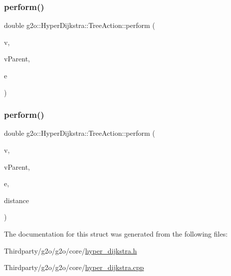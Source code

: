 \subsubsection{\texorpdfstring{perform()}{perform()}\hspace{0.1cm}{\footnotesize\ttfamily [1/2]}}
{\footnotesize\ttfamily double g2o\+::\+Hyper\+Dijkstra\+::\+Tree\+Action\+::perform (\begin{DoxyParamCaption}\item[{\mbox{\hyperlink{classg2o_1_1_hyper_graph_1_1_vertex}{Hyper\+Graph\+::\+Vertex}} $\ast$}]{v,  }\item[{\mbox{\hyperlink{classg2o_1_1_hyper_graph_1_1_vertex}{Hyper\+Graph\+::\+Vertex}} $\ast$}]{v\+Parent,  }\item[{\mbox{\hyperlink{classg2o_1_1_hyper_graph_1_1_edge}{Hyper\+Graph\+::\+Edge}} $\ast$}]{e }\end{DoxyParamCaption})\hspace{0.3cm}{\ttfamily [virtual]}}

\mbox{\label{structg2o_1_1_hyper_dijkstra_1_1_tree_action_a2f78bac199af9afea7105f3dd9f2e963}} 
\subsubsection{\texorpdfstring{perform()}{perform()}\hspace{0.1cm}{\footnotesize\ttfamily [2/2]}}
{\footnotesize\ttfamily double g2o\+::\+Hyper\+Dijkstra\+::\+Tree\+Action\+::perform (\begin{DoxyParamCaption}\item[{\mbox{\hyperlink{classg2o_1_1_hyper_graph_1_1_vertex}{Hyper\+Graph\+::\+Vertex}} $\ast$}]{v,  }\item[{\mbox{\hyperlink{classg2o_1_1_hyper_graph_1_1_vertex}{Hyper\+Graph\+::\+Vertex}} $\ast$}]{v\+Parent,  }\item[{\mbox{\hyperlink{classg2o_1_1_hyper_graph_1_1_edge}{Hyper\+Graph\+::\+Edge}} $\ast$}]{e,  }\item[{double}]{distance }\end{DoxyParamCaption})\hspace{0.3cm}{\ttfamily [virtual]}}



The documentation for this struct was generated from the following files\+:\begin{DoxyCompactItemize}
\item 
Thirdparty/g2o/g2o/core/\mbox{\hyperlink{hyper__dijkstra_8h}{hyper\+\_\+dijkstra.\+h}}\item 
Thirdparty/g2o/g2o/core/\mbox{\hyperlink{hyper__dijkstra_8cpp}{hyper\+\_\+dijkstra.\+cpp}}\end{DoxyCompactItemize}
